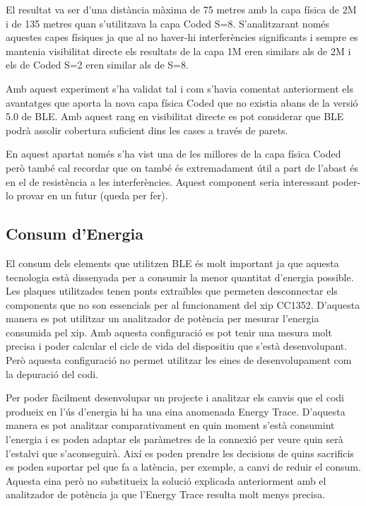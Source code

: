 El resultat va ser d'una distància màxima de 75 metres amb la capa física de 2M i de 135 metres quan s'utilitzava la capa Coded S=8.
S'analitzarant només aquestes capes físiques ja que al no haver-hi interferències significants i sempre es mantenia visibilitat directe els resultats de la capa 1M eren similars als de 2M i els de Coded S=2 eren similar als de S=8.

Amb aquest experiment s'ha validat tal i com s'havia comentat anteriorment els avantatges que aporta la nova capa física Coded que no existia abans de la versió 5.0 de BLE.
Amb aquest rang en visibilitat directe es pot considerar que BLE podrà assolir cobertura suficient dins les cases a través de parets.

En aquest apartat només s'ha vist una de les millores de la capa física Coded però també cal recordar que on també és extremadament útil a part de l'abast és en el de resistència a les interferències.
Aquest component seria interessant poder-lo provar en un futur (queda per fer).


\subsection{Consum d'Energia}

El consum dels elements que utilitzen BLE és molt important ja que aquesta tecnologia està dissenyada per a consumir la menor quantitat d'energia possible.
Les plaques utilitzades tenen ponts extraïbles que permeten desconnectar els components que no son essencials per al funcionament del xip CC1352.
D'aquesta manera es pot utilitzar un analitzador de potència per mesurar l'energia consumida pel xip.
Amb aquesta configuració es pot tenir una mesura molt precisa i poder calcular el cicle de vida del dispositiu que s'està desenvolupant.
Però aquesta configuració no permet utilitzar les eines de desenvolupament com la depuració del codi.

Per poder fàcilment desenvolupar un projecte i analitzar els canvis que el codi produeix en l'ús d'energia hi ha una eina anomenada Energy Trace.
D'aquesta manera es pot analitzar comparativament en quin moment s'està consumint l'energia i es poden adaptar els paràmetres de la connexió per veure quin serà l'estalvi que s'aconseguirà.
Així es poden prendre les decisions de quins sacrificis es poden suportar pel que fa a latència, per exemple, a canvi de reduir el consum.
Aquesta eina però no substitueix la solució explicada anteriorment amb el analitzador de potència ja que l'Energy Trace resulta molt menys precisa.

